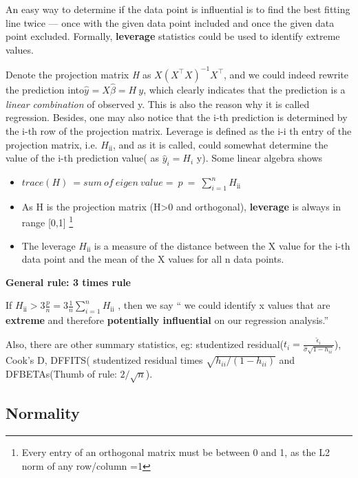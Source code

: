 An easy way to determine if the data point is influential is to find the
best fitting line twice --- once with the given data point included and
once the given data point excluded. Formally, \textbf{leverage}
statistics could be used to identify extreme values.

Denote the projection matrix \emph{H} as \(X(X^{\top}X)^{- 1}X^{\top}\),
and we could indeed rewrite the prediction
into\(\hat{y_{}} = X\hat{\beta} = H\ y\), which clearly indicates that
the prediction is a \emph{linear combination} of observed y. This is
also the reason why it is called regression. Besides, one may also
notice that the i-th prediction is determined by the i-th row of the
projection matrix. Leverage is defined as the i-i th entry of the
projection matrix, i.e. \(H_{\text{ii}}\), and as it is called, could
somewhat determine the value of the i-th prediction value( as
\({\hat{y}}_{i} = H_{i}\text{\ y}\)). Some linear algebra shows

\begin{itemize}
	\item
	\(trace(H)\  = sum\ of\ eigen\ value = \ p\  = \ \sum_{i = 1}^{n}H_{\text{ii}}\)
	\item
	As H is the projection matrix (H\textgreater{}0 and orthogonal),
	\textbf{leverage} is always in range {[}0,1{]} \footnote{Every entry
		of an orthogonal matrix must be between 0 and 1, as the L2 norm of
		any row/column =1}
	\item
	The leverage \(H_{\text{ii}}\) is a measure of the distance between
	the X value for the i-th data point and the mean of the X values for
	all n data points.
\end{itemize}

\noindent\textbf{General rule: 3 times rule}

If
\(H_{\text{ii}} > 3\frac{p}{n} = 3\frac{1}{n}\sum_{i = 1}^{n}H_{\text{ii}}\)
, then we say `` we could identify x values that are \textbf{extreme}
and therefore \textbf{potentially influential} on our regression
analysis.''

Also, there are other summary statistics, eg: studentized residual($t_i=\frac{\hat{\epsilon}_i}{\hat{\sigma}\sqrt{1-h_{ii}}}$),
Cook's D, DFFITS( studentized residual times
$\sqrt{h_{ii}/(1-h_{ii})}$
and DFBETAs(Thumb of rule: \(2/\sqrt{n}\)).

\subsection{Normality}\label{normality}

